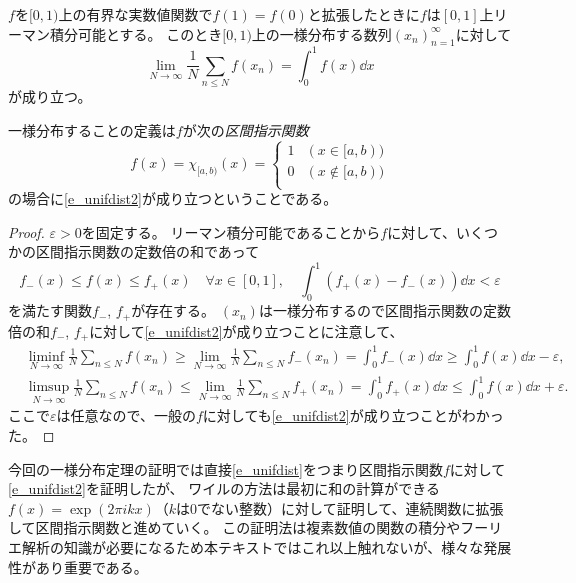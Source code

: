 \begin{proposition}
$f$を$[0, 1)$上の有界な実数値関数で$f(1) = f(0)$と拡張したときに$f$は$[0, 1]$上リーマン積分可能とする。
このとき$[0, 1)$上の一様分布する数列$(x_n)_{n = 1}^\infty$に対して
\begin{equation}
\label{e_unifdist2}
\lim_{N \to \infty}\frac{1}{N}\sum_{n \le N}f(x_n) = \int_0^1 f(x)\dd{x}
\end{equation}
が成り立つ。
\end{proposition}

\begin{remark}
一様分布することの定義は$f$が次の\emph{区間指示関数}
$$
f(x) = \chi_{[a, b)}(x) =
\begin{cases}
1 & (x \in [a, b)) \\
0 & (x \notin [a, b)) \\
\end{cases}
$$
の場合に\eqref{e_unifdist2}が成り立つということである。
\end{remark}

\begin{proof}
$\varepsilon > 0$を固定する。
リーマン積分可能であることから$f$に対して、いくつかの区間指示関数の定数倍の和であって
$$
f_-(x) \le f(x) \le f_+(x) \quad \forall x \in [0, 1], \quad \int_0^1 (f_+(x)-f_-(x))\dd{x} < \varepsilon
$$
を満たす関数$f_-$, $f_+$が存在する。
$(x_n)$は一様分布するので区間指示関数の定数倍の和$f_-$, $f_+$に対して\eqref{e_unifdist2}が成り立つことに注意して、
\begin{align*}
&\liminf_{N \to \infty}\frac{1}{N}\sum_{n \le N}f(x_n) \ge \lim_{N \to \infty}\frac{1}{N}\sum_{n \le N}f_-(x_n) = \int_0^1 f_-(x)\dd{x} \ge \int_0^1 f(x)\dd{x}-\varepsilon, \\
&\limsup_{N \to \infty}\frac{1}{N}\sum_{n \le N}f(x_n) \le \lim_{N \to \infty}\frac{1}{N}\sum_{n \le N}f_+(x_n) = \int_0^1 f_+(x)\dd{x} \le \int_0^1 f(x)\dd{x}+\varepsilon.
\end{align*}
ここで$\varepsilon$は任意なので、一般の$f$に対しても\eqref{e_unifdist2}が成り立つことがわかった。
\end{proof}

\begin{remark}
今回の一様分布定理の証明では直接\eqref{e_unifdist}をつまり区間指示関数$f$に対して\eqref{e_unifdist2}を証明したが、
ワイルの方法は最初に和の計算ができる$f(x) = \exp(2\pi i k x)$（$k$は$0$でない整数）に対して証明して、連続関数に拡張して区間指示関数と進めていく。
この証明法は複素数値の関数の積分やフーリエ解析の知識が必要になるため本テキストではこれ以上触れないが、様々な発展性があり重要である。
\end{remark}

